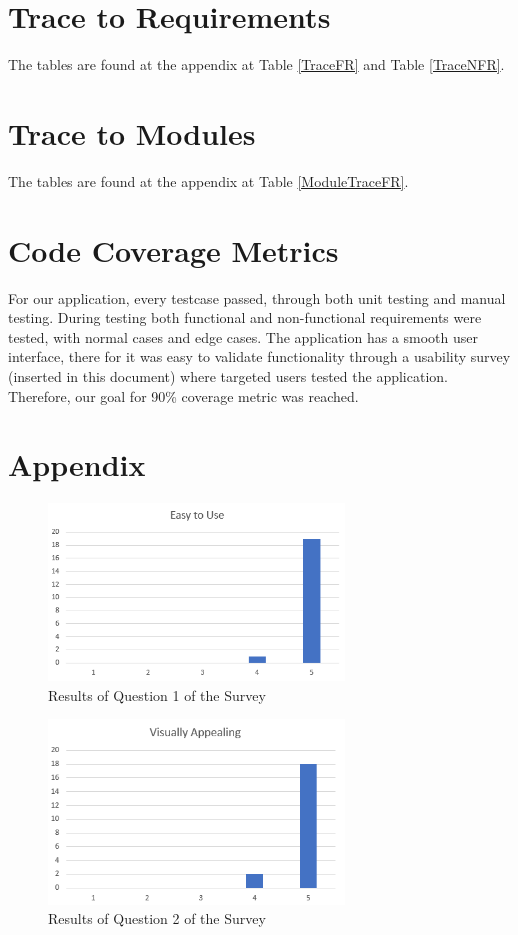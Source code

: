 \documentclass[12pt, titlepage]{article}
\begin{document}
\section{Trace to Requirements}
The tables are found at the appendix at Table \ref{TraceFR} and Table \ref{TraceNFR}.

\section{Trace to Modules}		
The tables are found at the appendix at Table \ref{ModuleTraceFR}.

\section{Code Coverage Metrics}
For our application, every testcase passed, through both unit testing and manual testing. During testing both functional and non-functional requirements were tested, with normal cases and edge cases. The application has a smooth user interface, there for it was easy to validate functionality through a usability survey (inserted in this document) where targeted users tested the application. Therefore, our goal for 90\% coverage metric was reached.

\section{Appendix}
\begin{figure}[h]
\centering
\includegraphics[width=0.7\textwidth]{Question1.png}
\caption{Results of Question 1 of the Survey}
\label{Q1}
\end{figure}

\begin{figure}[h]
\centering
\includegraphics[width=0.7\textwidth]{Question2.png}
\caption{Results of Question 2 of the Survey}
\label{Q2}
\end{figure}
\end{document}
